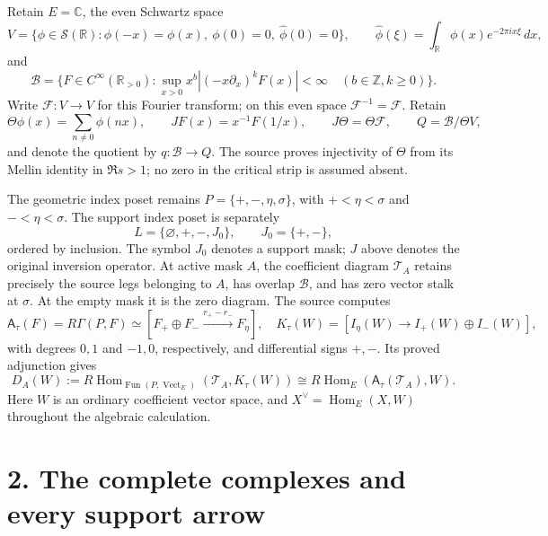 \documentclass[10pt,a4paper,oneside]{report}
\begin{document}
Retain \(E=\mathbb C\), the even Schwartz space \[
V=\{\phi\in\mathcal S(\mathbb R):\phi(-x)=\phi(x),\ \phi(0)=0,\ \widehat\phi(0)=0\},
\qquad
\widehat\phi(\xi)=\int_{\mathbb R}\phi(x)e^{-2\pi i x\xi}\,dx,
\] and \[
\mathscr B=\{F\in C^\infty(\mathbb R_{>0}):
\sup_{x>0}x^b|(-x\partial_x)^kF(x)|<\infty\quad(b\in\mathbb Z,k\ge0)\}.
\] Write \(\mathcal F:V\to V\) for this Fourier transform; on this even
space \(\mathcal F^{-1}=\mathcal F\). Retain \[
\Theta\phi(x)=\sum_{n\ne0}\phi(nx),\qquad
JF(x)=x^{-1}F(1/x),\qquad J\Theta=\Theta\mathcal F,
\qquad Q=\mathscr B/\Theta V,
\] and denote the quotient by \(q:\mathscr B\to Q\). The source proves
injectivity of \(\Theta\) from its Mellin identity in \(\Re s>1\); no
zero in the critical strip is assumed absent.

The geometric index poset remains \(P=\{+,-,\eta,\sigma\}\), with
\(+<\eta<\sigma\) and \(-<\eta<\sigma\). The support index poset is
separately \[
L=\{\varnothing,+,-,J_0\},\qquad J_0=\{+,-\},
\] ordered by inclusion. The symbol \(J_0\) denotes a support mask;
\(J\) above denotes the original inversion operator. At active mask
\(A\), the coefficient diagram \(\mathcal T_A\) retains precisely the
source legs belonging to \(A\), has overlap \(\mathscr B\), and has zero
vector stalk at \(\sigma\). At the empty mask it is the zero diagram.
The source computes \[
\mathsf A_\tau(F)=R\Gamma(P,F)
\simeq[F_+\oplus F_-\xrightarrow{r_+-r_-}F_\eta],
\quad
K_\tau(W)=[I_\eta(W)\longrightarrow I_+(W)\oplus I_-(W)],
\] with degrees \(0,1\) and \(-1,0\), respectively, and differential
signs \(+,-\). Its proved adjunction gives \[
D_A(W):=R\operatorname{Hom}_{\operatorname{Fun}(P,\operatorname{Vect}_E)}
(\mathcal T_A,K_\tau(W))
\cong R\operatorname{Hom}_E(\mathsf A_\tau(\mathcal T_A),W).
\] Here \(W\) is an ordinary coefficient vector space, and
\(X^\vee=\operatorname{Hom}_E(X,W)\) throughout the algebraic
calculation.

\section{2. The complete complexes and every support
arrow}\label{proof03:the-complete-complexes-and-every-support-arrow}
\end{document}
